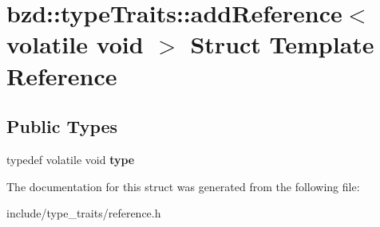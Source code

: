 \hypertarget{structbzd_1_1typeTraits_1_1addReference_3_01volatile_01void_01_4}{}\section{bzd\+:\+:type\+Traits\+:\+:add\+Reference$<$ volatile void $>$ Struct Template Reference}
\label{structbzd_1_1typeTraits_1_1addReference_3_01volatile_01void_01_4}
\subsection*{Public Types}
\begin{DoxyCompactItemize}
\item 
\mbox{\label{structbzd_1_1typeTraits_1_1addReference_3_01volatile_01void_01_4_aae06bccbb940ba96e7d73322f43b70f5}} 
typedef volatile void {\bfseries type}
\end{DoxyCompactItemize}


The documentation for this struct was generated from the following file\+:\begin{DoxyCompactItemize}
\item 
include/type\+\_\+traits/reference.\+h\end{DoxyCompactItemize}
